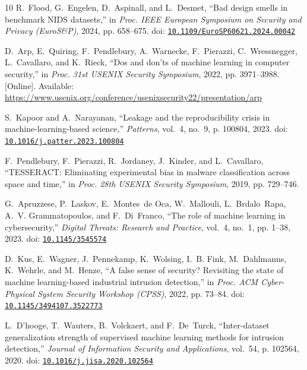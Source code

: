 \begin{thebibliography}{10}
R.~Flood, G.~Engelen, D.~Aspinall, and L.~Desmet, ``Bad design smells in
  benchmark {NIDS} datasets,'' in \emph{Proc. IEEE European Symposium on
  Security and Privacy (EuroS\&P)}, 2024, pp. 658--675. doi:
  \href{https://doi.org/10.1109/EuroSP60621.2024.00042}{\nolinkurl{10.1109/EuroSP60621.2024.00042}}

\BIBentryALTinterwordspacing
D.~Arp, E.~Quiring, F.~Pendlebury, A.~Warnecke, F.~Pierazzi, C.~Wressnegger,
  L.~Cavallaro, and K.~Rieck, ``Dos and don'ts of machine learning in computer
  security,'' in \emph{Proc. 31st USENIX Security Symposium}, 2022, pp.
  3971--3988. [Online]. Available:
  \url{https://www.usenix.org/conference/usenixsecurity22/presentation/arp}
\BIBentrySTDinterwordspacing

S.~Kapoor and A.~Narayanan, ``Leakage and the reproducibility crisis in
  machine-learning-based science,'' \emph{Patterns}, vol.~4, no.~9, p. 100804,
  2023. doi:
  \href{https://doi.org/10.1016/j.patter.2023.100804}{\nolinkurl{10.1016/j.patter.2023.100804}}

F.~Pendlebury, F.~Pierazzi, R.~Jordaney, J.~Kinder, and L.~Cavallaro,
  ``{TESSERACT}: Eliminating experimental bias in malware classification across
  space and time,'' in \emph{Proc. 28th USENIX Security Symposium}, 2019, pp.
  729--746.

G.~Apruzzese, P.~Laskov, E.~Montes~de Oca, W.~Mallouli, L.~Brdalo~Rapa, A.~V.
  Grammatopoulos, and F.~Di~Franco, ``The role of machine learning in
  cybersecurity,'' \emph{Digital Threats: Research and Practice}, vol.~4,
  no.~1, pp. 1--38, 2023. doi:
  \href{https://doi.org/10.1145/3545574}{\nolinkurl{10.1145/3545574}}

D.~Kus, E.~Wagner, J.~Pennekamp, K.~Wolsing, I.~B. Fink, M.~Dahlmanns,
  K.~Wehrle, and M.~Henze, ``A false sense of security? {R}evisiting the state
  of machine learning-based industrial intrusion detection,'' in \emph{Proc.
  ACM Cyber-Physical System Security Workshop (CPSS)}, 2022, pp. 73--84. doi:
  \href{https://doi.org/10.1145/3494107.3522773}{\nolinkurl{10.1145/3494107.3522773}}

L.~D'hooge, T.~Wauters, B.~Volckaert, and F.~De~Turck, ``Inter-dataset
  generalization strength of supervised machine learning methods for intrusion
  detection,'' \emph{Journal of Information Security and Applications},
  vol.~54, p. 102564, 2020. doi:
  \href{https://doi.org/10.1016/j.jisa.2020.102564}{\nolinkurl{10.1016/j.jisa.2020.102564}}


\end{thebibliography}
